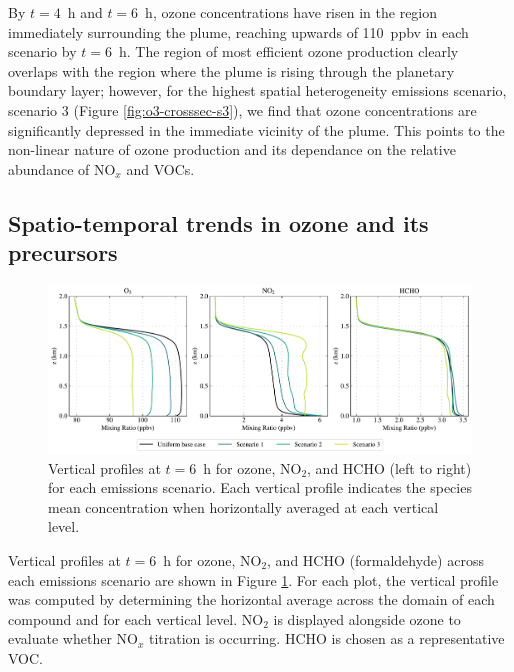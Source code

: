 By $t=4$~h and $t=6$~h, ozone concentrations have risen in the region immediately surrounding the plume, reaching upwards of 110~\si{ppbv} in each scenario by $t=6$~h. The region of most efficient ozone production clearly overlaps with the region where the plume is rising through the planetary boundary layer; however, for the highest spatial heterogeneity emissions scenario, scenario 3 (Figure \ref{fig:o3-crosssec-s3}), we find that ozone concentrations are significantly depressed in the immediate vicinity of the plume. This points to the non-linear nature of ozone production and its dependance on the relative abundance of NO$_x$ and VOCs.

\subsection{Spatio-temporal trends in ozone and its precursors}

\begin{figure}[h]
    \centering
    \includegraphics[width=\textwidth]{figures/chapter4/vertical-profiles-time36.pdf}
    \caption{Vertical profiles at $t=6$~h for ozone, NO$_2$, and HCHO (left to right) for each emissions scenario. Each vertical profile indicates the species mean concentration when horizontally averaged at each vertical level.}
    \label{fig:vertical-profiles-o3-nox-hcho}
  \end{figure}
  
Vertical profiles at $t=6$~h for ozone, NO$_2$, and HCHO (formaldehyde) across each emissions scenario are shown in Figure \ref{fig:vertical-profiles-o3-nox-hcho}. For each plot, the vertical profile was computed by determining the horizontal average across the domain of each compound and for each vertical level. NO$_2$ is displayed alongside ozone to evaluate whether NO$_x$ titration is occurring. HCHO is chosen as a representative VOC.

